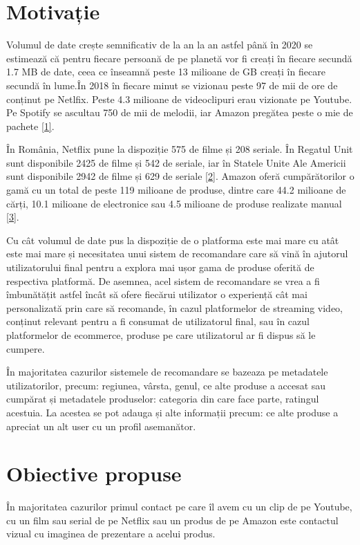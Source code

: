 \section{Motivație}

Volumul de date crește semnificativ de la an la an astfel până în 2020 se estimează că pentru fiecare persoană de pe planetă vor fi creați în fiecare secundă 1.7 MB de date, ceea ce înseamnă peste 13 milioane de GB creați în fiecare secundă în lume.În 2018 în fiecare minut se vizionau peste 97 de mii de ore de conținut pe Netlfix. Peste 4.3 milioane de videoclipuri erau vizionate pe Youtube. Pe Spotify se ascultau 750 de mii de melodii, iar Amazon pregătea peste o mie de pachete \hyperlink{domo}{[1]}.

În România, Netflix pune la dispoziție 575 de filme și 208 seriale. În Regatul Unit sunt disponibile 2425 de filme și 542 de seriale, iar în Statele Unite Ale Americii sunt disponibile 2942 de filme și 629 de seriale \hyperlink{finder}{[2]}. Amazon oferă cumpărătorilor o gamă cu un total de peste 119 milioane de produse, dintre care 44.2 milioane de cărți, 10.1 milioane de electronice sau 4.5 milioane de produse realizate manual \hyperlink{scrapehero}{[3]}.

Cu cât volumul de date pus la dispoziție de o platforma este mai mare cu atât este mai mare și necesitatea unui sistem de recomandare care să vină în ajutorul utilizatorului final pentru a explora mai ușor gama de produse oferită de respectiva platformă. De asemnea, acel sistem de recomandare se vrea a fi îmbunătățit astfel încât să ofere fiecărui utilizator o experiență cât mai personalizată prin care să recomande, în cazul platformelor de streaming video, conținut relevant pentru a fi consumat de utilizatorul final, sau în cazul platformelor de ecommerce, produse pe care utilizatorul ar fi dispus să le cumpere.

În majoritatea cazurilor sistemele de recomandare se bazeaza pe metadatele utilizatorilor, precum: regiunea, vârsta, genul, ce alte produse a accesat sau cumpărat și metadatele produselor: categoria din care face parte, ratingul acestuia. La acestea se pot adauga și alte informații precum: ce alte produse a apreciat un alt user cu un profil asemanător.

\section{Obiective propuse}
În majoritatea cazurilor primul contact pe care îl avem cu un clip de pe Youtube, cu un film sau serial de pe Netflix sau un produs de pe Amazon este contactul vizual cu imaginea de prezentare a acelui produs.

